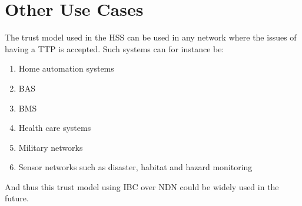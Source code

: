 \section{Other Use Cases}
The trust model used in the \gls{HSS} can be used in any network where the issues of having a \gls{TTP} is accepted. 
Such systems can for instance be:
\begin{enumerate}
	\item Home automation systems
	\item \gls{BAS}
	\item \gls{BMS}
	\item Health care systems
	\item Military networks
	\item Sensor networks such as disaster, habitat and hazard monitoring
\end{enumerate}

And thus this trust model using \gls{IBC} over \gls{NDN} could be widely used in the future.
